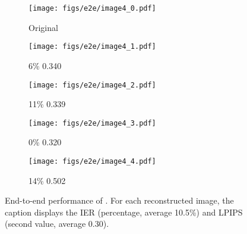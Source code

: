 \begin{figure}[t]
    \vspace{-2.7em}
    \begin{minipage}{0.06\textwidth}
        \centering
    \end{minipage}%
    \begin{subfigure}[b]{0.075\textwidth}
        \texttt{[image: figs/e2e/image4\_0.pdf]}
        \caption*{\scriptsize Original}
    \end{subfigure}
    \begin{subfigure}[b]{0.075\textwidth}
        \texttt{[image: figs/e2e/image4\_1.pdf]}
        \caption*{\scriptsize 6\% 0.340}
    \end{subfigure}
    \begin{subfigure}[b]{0.075\textwidth}
        \texttt{[image: figs/e2e/image4\_2.pdf]}
        \caption*{\scriptsize 11\% 0.339}
    \end{subfigure}
        \begin{subfigure}[b]{0.075\textwidth}
        \texttt{[image: figs/e2e/image4\_3.pdf]}
        \caption*{\scriptsize 0\% 0.320}
    \end{subfigure}
        \begin{subfigure}[b]{0.075\textwidth}
        \texttt{[image: figs/e2e/image4\_4.pdf]}
        \caption*{\scriptsize 14\% 0.502}
    \end{subfigure}
    \vspace{-2.7em}
    \caption{End-to-end performance of \sysname. For each reconstructed image, the caption displays the IER (percentage, average 10.5\%) and LPIPS (second value, average 0.30).}
    \label{fig:eval_overall}

\end{figure}
